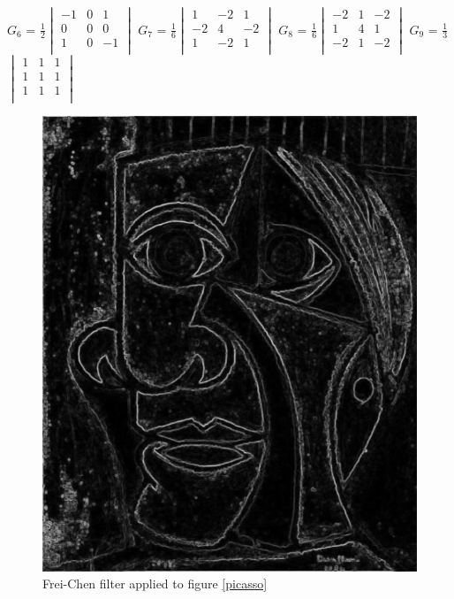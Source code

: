 \documentclass[12pt]{article}
\begin{document}
$G_6$ = $\frac{1}{2}$$\begin{vmatrix}
        -1 & 0 & 1\\
        0 & 0 & 0\\
        1 & 0 & -1\\
\end{vmatrix}$\hspace{5mm}
\newline
$G_7$ = $\frac{1}{6}$$\begin{vmatrix}
        1 & -2 & 1\\
        -2 & 4 & -2\\
        1 & -2 & 1\\
\end{vmatrix}$\hspace{13mm}
$G_8$ = $\frac{1}{6}$$\begin{vmatrix}
        -2 & 1 & -2\\
        1 & 4 & 1\\
        -2 & 1 & -2\\
\end{vmatrix}$\hspace{11mm}
$G_9$ = $\frac{1}{3}$$\begin{vmatrix}
        1 & 1 & 1\\
        1 & 1 & 1\\
        1 & 1 & 1\\
\end{vmatrix}$\hspace{5mm}

\begin{figure}[h]
\centering
\includegraphics[scale = 0.39]{img/picassoFreiChen}
\caption{Frei-Chen filter applied to figure \ref{picasso}}
\label{freichen}
\end{figure}
\end{document}
